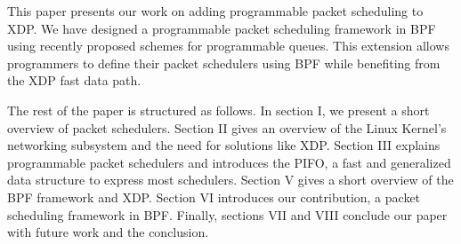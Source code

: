 \documentclass[sigconf, nonacm]{acmart}
\begin{document}
This paper presents our work on adding programmable packet scheduling to XDP. We have designed a programmable packet scheduling framework in BPF using recently proposed schemes for programmable queues. This extension allows programmers to define their packet schedulers using BPF while benefiting from the XDP fast data path.

The rest of the paper is structured as follows. In section I, we present a short overview of packet schedulers. Section II gives an overview of the Linux Kernel's networking subsystem and the need for solutions like XDP. Section III explains programmable packet schedulers and introduces the PIFO, a fast and generalized data structure to express most schedulers. Section V gives a short overview of the BPF framework and XDP. Section VI introduces our contribution, a packet scheduling framework in BPF. Finally, sections VII and VIII conclude our paper with future work and the conclusion.
\end{document}
